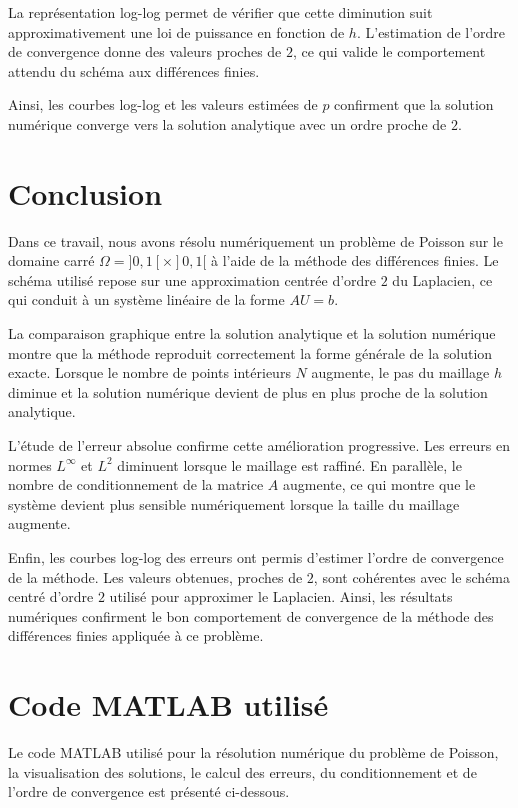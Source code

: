 \documentclass[12pt,a4paper]{article}
\begin{document}
La représentation log-log permet de vérifier que cette diminution suit
approximativement une loi de puissance en fonction de $h$. L'estimation de
l'ordre de convergence donne des valeurs proches de $2$, ce qui valide le
comportement attendu du schéma aux différences finies.

Ainsi, les courbes log-log et les valeurs estimées de $p$ confirment que la
solution numérique converge vers la solution analytique avec un ordre proche de
$2$.
\newpage

\section*{Conclusion}

Dans ce travail, nous avons résolu numériquement un problème de Poisson sur le
domaine carré $\Omega=]0,1[\times]0,1[$ à l'aide de la méthode des différences
finies. Le schéma utilisé repose sur une approximation centrée d'ordre $2$ du
Laplacien, ce qui conduit à un système linéaire de la forme $AU=b$.

La comparaison graphique entre la solution analytique et la solution numérique
montre que la méthode reproduit correctement la forme générale de la solution
exacte. Lorsque le nombre de points intérieurs $N$ augmente, le pas du maillage
$h$ diminue et la solution numérique devient de plus en plus proche de la
solution analytique.

L'étude de l'erreur absolue confirme cette amélioration progressive. Les erreurs
en normes $L^\infty$ et $L^2$ diminuent lorsque le maillage est raffiné. En
parallèle, le nombre de conditionnement de la matrice $A$ augmente, ce qui montre
que le système devient plus sensible numériquement lorsque la taille du maillage
augmente.

Enfin, les courbes log-log des erreurs ont permis d'estimer l'ordre de
convergence de la méthode. Les valeurs obtenues, proches de $2$, sont cohérentes
avec le schéma centré d'ordre $2$ utilisé pour approximer le Laplacien. Ainsi,
les résultats numériques confirment le bon comportement de convergence de la
méthode des différences finies appliquée à ce problème.

\newpage
\section*{Code MATLAB utilisé}

Le code MATLAB utilisé pour la résolution numérique du problème de Poisson, la
visualisation des solutions, le calcul des erreurs, du conditionnement et de
l'ordre de convergence est présenté ci-dessous.
\end{document}
